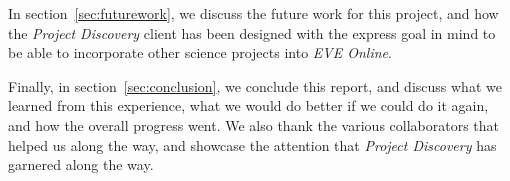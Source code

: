 In section~\ref{sec:futurework}, we discuss the future work for this project, and how the \emph{Project Discovery} client has been designed with the express goal in mind to be able to incorporate other science projects into \emph{EVE Online}.

Finally, in section~\ref{sec:conclusion}, we conclude this report, and discuss what we learned from this experience, what we would do better if we could do it again, and how the overall progress went. We also thank the various collaborators that helped us along the way, and showcase the attention that \emph{Project Discovery} has garnered along the way.